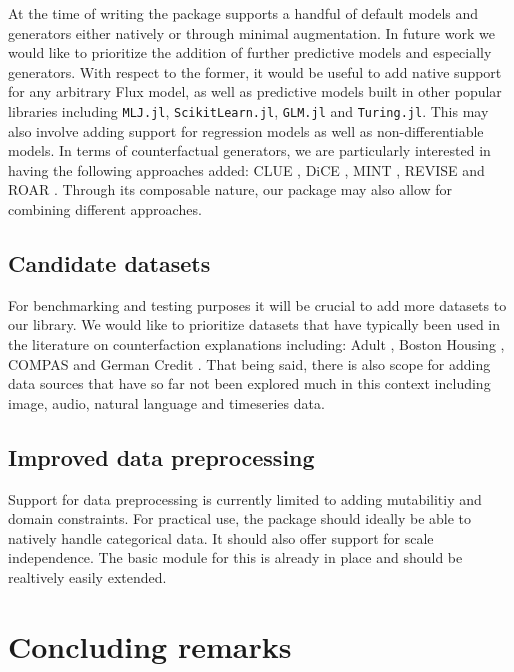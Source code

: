 \documentclass{juliacon}
\begin{document}
At the time of writing the package supports a handful of default models
and generators either natively or through minimal augmentation. In
future work we would like to prioritize the addition of further
predictive models and especially generators. With respect to the former,
it would be useful to add native support for any arbitrary Flux model,
as well as predictive models built in other popular libraries including
\texttt{MLJ.jl}, \texttt{ScikitLearn.jl}, \texttt{GLM.jl} and
\texttt{Turing.jl}. This may also involve adding support for regression
models as well as non-differentiable models. In terms of counterfactual
generators, we are particularly interested in having the following
approaches added: CLUE \cite{antoran2020getting}, DiCE
\cite{mothilal2020explaining}, MINT \cite{karimi2021algorithmic}, REVISE
\cite{joshi2019realistic} and ROAR \cite{upadhyay2021towards}. Through
its composable nature, our package may also allow for combining
different approaches.

\hypertarget{candidate-datasets}{%
\subsection{Candidate datasets}\label{candidate-datasets}}

For benchmarking and testing purposes it will be crucial to add more
datasets to our library. We would like to prioritize datasets that have
typically been used in the literature on counterfaction explanations
including: Adult \cite{adult1996}, Boston Housing \cite{boston1993},
COMPAS \cite{compas2016} and German Credit \cite{germancredit1994}. That
being said, there is also scope for adding data sources that have so far
not been explored much in this context including image, audio, natural
language and timeseries data.

\hypertarget{improved-data-preprocessing}{%
\subsection{Improved data
preprocessing}\label{improved-data-preprocessing}}

Support for data preprocessing is currently limited to adding
mutabilitiy and domain constraints. For practical use, the package
should ideally be able to natively handle categorical data. It should
also offer support for scale independence. The basic module for this is
already in place and should be realtively easily extended.

\hypertarget{sec-conclude}{%
\section{Concluding remarks}\label{sec-conclude}}
\end{document}
